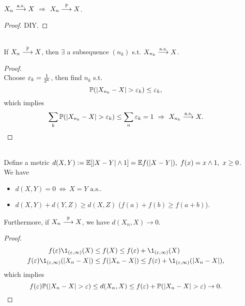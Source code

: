 \vspace{3pt}
\begin{lemma}\ \\
$X_n \overset{\text{a.s.}}{\longrightarrow} X$ $\Rightarrow$ $X_n \overset{\mathbb{P}}{\longrightarrow} X$.
\end{lemma}
\begin{proof}
DIY.
\end{proof}

\vspace{3pt}
\begin{lemma}\label{2.13}\ \\
If $X_n \overset{\mathbb{P}}{\longrightarrow} X$, then $\exists$ a subsequence $(n_k)$ s.t. $X_{n_k} \overset{\text{a.s.}}{\longrightarrow} X$.
\end{lemma}
\begin{proof}\ \\
Choose $\varepsilon_k = \frac{1}{2^k}$, then find $n_k$ s.t.
\begin{equation*}
\mathbb{P}(\abs{X_{n_k} - X} > \varepsilon_k) \leq \varepsilon_k,    
\end{equation*}
which implies
\begin{equation*}
    \sum_k \P(\abs{X_{n_k} - X} > \vep_k) \leq \sum_n \vep_k = 1\ \Rightarrow\ X_{n_k} \asto X.
\end{equation*}
\end{proof}

\vspace{3pt}
\begin{theorem}\ \\
Define a metric $d(X,Y):= \mathbb{E}[\abs{X - Y} \wedge 1] = \mathbb{E} f(\abs{X-Y}),\ f(x) = x \wedge 1,\ x \geq 0$. We have
\begin{itemize}
    \item $d(X,Y) = 0\ \Leftrightarrow\ X = Y \text{ a.s.}$.
    \item $d(X,Y) + d(Y,Z) \geq d(X,Z)$ ($f(a) + f(b) \geq f(a+b)$).
\end{itemize}
Furthermore, if $X_n \overset{\mathbb{P}}{\longrightarrow} X$, we have $d(X_n, X) \to 0$.
\end{theorem}
\begin{proof}\ 
\begin{equation*}
\begin{aligned}
        f(\vep) \1_{(\vep,\infty)} (X) &\leq f(X) \leq f(\vep) + \1_{(\vep,\infty)}(X)\\
        f(\vep) \1_{(\vep,\infty)} (\abs{X_n - X}) &\leq f (\abs{X_n - X}) \leq f(\vep) + \1_{(\vep,\infty)} (\abs{X_n - X}),
\end{aligned}
\end{equation*}
which implies
\begin{equation*}
    f(\varepsilon)\mathbb{P}(\abs{X_n - X} > \varepsilon) \leq d(X_n ,X) \leq f(\varepsilon) + \mathbb{P}(\abs{X_n - X} > \varepsilon) \to 0.
\end{equation*}
\end{proof}

